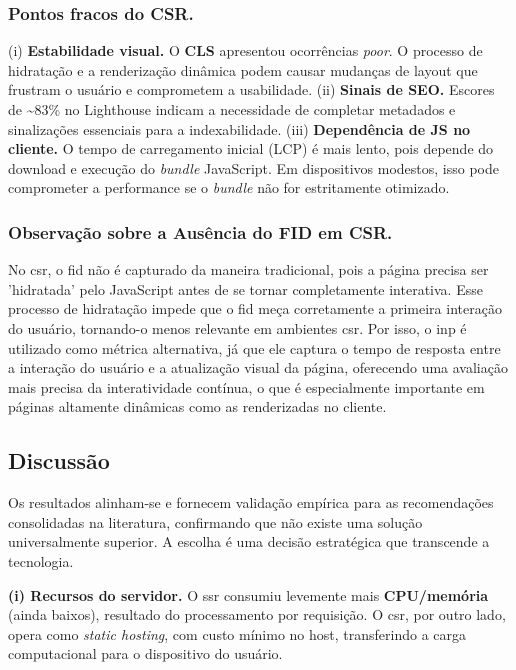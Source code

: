 \subsubsection{Pontos fracos do CSR.}
(i) \textbf{Estabilidade visual.} O \textbf{CLS} apresentou ocorrências \textit{poor}. O processo de hidratação e a renderização dinâmica podem causar mudanças de layout que frustram o usuário e comprometem a usabilidade.
(ii) \textbf{Sinais de SEO.} Escores de \textasciitilde83\% no Lighthouse indicam a necessidade de completar metadados e sinalizações essenciais para a indexabilidade.
(iii) \textbf{Dependência de JS no cliente.} O tempo de carregamento inicial (LCP) é mais lento, pois depende do download e execução do \textit{bundle} JavaScript. Em dispositivos modestos, isso pode comprometer a performance se o \textit{bundle} não for estritamente otimizado.

\subsubsection{Observação sobre a Ausência do FID em CSR.}
No \acrshort{csr}, o \acrfull{fid} não é capturado da maneira tradicional, pois a página precisa ser 'hidratada' pelo JavaScript antes de se tornar completamente interativa. Esse processo de hidratação impede que o \acrshort{fid} meça corretamente a primeira interação do usuário, tornando-o menos relevante em ambientes \acrshort{csr}. Por isso, o \acrfull{inp} é utilizado como métrica alternativa, já que ele captura o tempo de resposta entre a interação do usuário e a atualização visual da página, oferecendo uma avaliação mais precisa da interatividade contínua, o que é especialmente importante em páginas altamente dinâmicas como as renderizadas no cliente.

\subsection{Discussão}
\label{subsec:discussao-comparativa}
Os resultados alinham-se e fornecem validação empírica para as recomendações consolidadas na literatura, confirmando que não existe uma solução universalmente superior. A escolha é uma decisão estratégica que transcende a tecnologia.

\textbf{(i) Recursos do servidor.} O \acrshort{ssr} consumiu levemente mais \textbf{CPU/memória} (ainda baixos), resultado do processamento por requisição. O \acrshort{csr}, por outro lado, opera como \emph{static hosting}, com custo mínimo no host, transferindo a carga computacional para o dispositivo do usuário.

